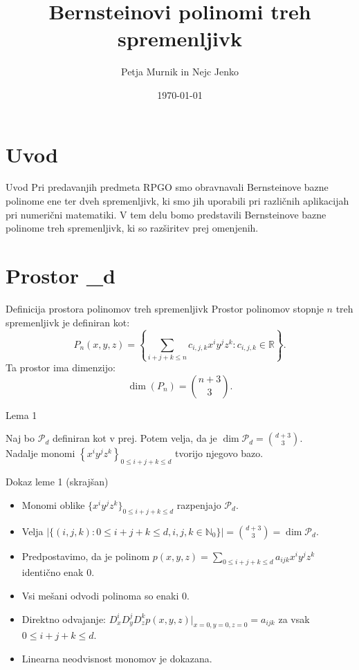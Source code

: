 \documentclass{beamer}
\title{Bernsteinovi polinomi treh spremenljivk}
\author{Petja Murnik in Nejc Jenko}
\date{\today}
\begin{document}
\frame{\titlepage}

\section{Uvod}
\begin{frame}{Uvod}
    Pri predavanjih predmeta RPGO smo obravnavali Bernsteinove bazne polinome ene ter dveh spremenljivk, 
    ki smo jih uporabili pri različnih aplikacijah pri numerični matematiki.
    \newline
    V tem delu bomo predstavili Bernsteinove bazne polinome treh spremenljivk, ki so razširitev prej omenjenih.
\end{frame}

\section{Prostor _d}
\begin{frame}{Definicija prostora polinomov treh spremenljivk}
    Prostor polinomov stopnje $n$ treh spremenljivk je definiran kot:
    \[
    P_n(x, y, z) = \left\{ \sum_{i+j+k \leq n} c_{i,j,k} x^i y^j z^k : c_{i,j,k} \in \mathbb{R} \right\}.
    \]
    Ta prostor ima dimenzijo:
    \[
    \dim(P_n) = \binom{n+3}{3}.
    \]
\end{frame}


\begin{frame}{Lema 1}
\begin{lemma}
    Naj bo $\mathcal{P}_d$ definiran kot v prej.
    Potem velja, da je $\dim \mathcal{P}_d = \binom{d+3}{3} $. \\
    Nadalje monomi $\left\{x^i y^j z^k \right\}_{0 \le i  + j + k \le d}$ tvorijo njegovo bazo.
\end{lemma}
\end{frame}


\begin{frame}{Dokaz leme 1 (skrajšan)}
    \begin{itemize}
        \item Monomi oblike $\{x^i y^j z^k\}_{0 \le i + j + k \le d}$ razpenjajo $\mathcal{P}_d$.
        \item Velja $|\{(i, j, k) : 0 \le i + j + k \le d, i, j, k \in \mathbb{N}_0\}| = \binom{d+3}{3} = \dim \mathcal{P}_d$.
        \item Predpostavimo, da je polinom $p(x, y, z) = \sum_{0 \le i + j + k \le d} a_{ijk} x^i y^j z^k$ identično enak 0.
        \item Vsi mešani odvodi polinoma so enaki 0.
        \item Direktno odvajanje: $D^i_x D^j_y D^k_z p(x, y, z)|_{x=0, y=0, z=0} = a_{ijk}$ za vsak $0 \le i + j + k \le d$.
        \item Linearna neodvisnost monomov je dokazana.
    \end{itemize}
\end{frame}
\end{document}
